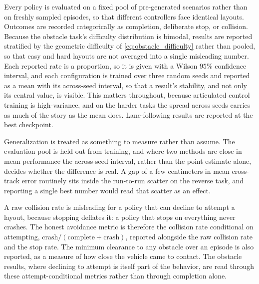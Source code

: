 Every policy is evaluated on a fixed pool of pre-generated scenarios rather than on freshly sampled episodes, so that different controllers face identical layouts. Outcomes are recorded categorically as completion, deliberate stop, or collision. Because the obstacle task's difficulty distribution is bimodal, results are reported stratified by the geometric difficulty of \cref{eq:obstacle_difficulty} rather than pooled, so that easy and hard layouts are not averaged into a single misleading number. Each reported rate is a proportion, so it is given with a Wilson $95\%$ confidence interval, and each configuration is trained over three random seeds and reported as a mean with its across-seed interval, so that a result's stability, and not only its central value, is visible. This matters throughout, because articulated control training is high-variance, and on the harder tasks the spread across seeds carries as much of the story as the mean does. Lane-following results are reported at the best checkpoint.

Generalization is treated as something to measure rather than assume. The evaluation pool is held out from training, and where two methods are close in mean performance the across-seed interval, rather than the point estimate alone, decides whether the difference is real. A gap of a few centimeters in mean cross-track error routinely sits inside the run-to-run scatter on the reverse task, and reporting a single best number would read that scatter as an effect.

A raw collision rate is misleading for a policy that can decline to attempt a layout, because stopping deflates it: a policy that stops on everything never crashes. The honest avoidance metric is therefore the collision rate conditional on attempting, $\mathrm{crash}/(\mathrm{complete}+\mathrm{crash})$, reported alongside the raw collision rate and the stop rate. The minimum clearance to any obstacle over an episode is also reported, as a measure of how close the vehicle came to contact. The obstacle results, where declining to attempt is itself part of the behavior, are read through these attempt-conditional metrics rather than through completion alone.

